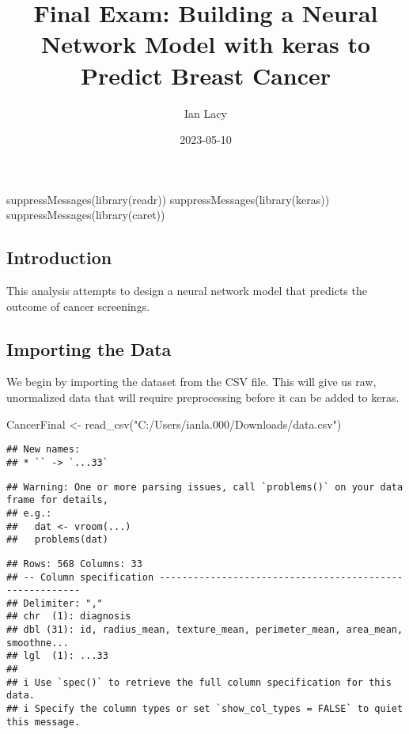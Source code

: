 \documentclass[
]{article}
\title{Final Exam: Building a Neural Network Model with keras to Predict
Breast Cancer}
\author{Ian Lacy}
\date{2023-05-10}
\newenvironment{Shaded}{\begin{snugshade}}{\end{snugshade}}
\newcommand{\FunctionTok}[1]{\textcolor[rgb]{0.00,0.00,0.00}{#1}}
\newcommand{\NormalTok}[1]{#1}
\newcommand{\OtherTok}[1]{\textcolor[rgb]{0.56,0.35,0.01}{#1}}
\newcommand{\StringTok}[1]{\textcolor[rgb]{0.31,0.60,0.02}{#1}}
\begin{document}
\maketitle

\begin{Shaded}
\begin{Highlighting}[]
\FunctionTok{suppressMessages}\NormalTok{(}\FunctionTok{library}\NormalTok{(readr))}
\FunctionTok{suppressMessages}\NormalTok{(}\FunctionTok{library}\NormalTok{(keras))}
\FunctionTok{suppressMessages}\NormalTok{(}\FunctionTok{library}\NormalTok{(caret))}
\end{Highlighting}
\end{Shaded}

\hypertarget{introduction}{%
\subsection{Introduction}\label{introduction}}

This analysis attempts to design a neural network model that predicts
the outcome of cancer screenings.

\hypertarget{importing-the-data}{%
\subsection{Importing the Data}\label{importing-the-data}}

We begin by importing the dataset from the CSV file. This will give us
raw, unormalized data that will require preprocessing before it can be
added to keras.

\begin{Shaded}
\begin{Highlighting}[]
\NormalTok{CancerFinal }\OtherTok{\textless{}{-}} \FunctionTok{read\_csv}\NormalTok{(}\StringTok{"C:/Users/ianla.000/Downloads/data.csv"}\NormalTok{)}
\end{Highlighting}
\end{Shaded}

\begin{verbatim}
## New names:
## * `` -> `...33`
\end{verbatim}

\begin{verbatim}
## Warning: One or more parsing issues, call `problems()` on your data frame for details,
## e.g.:
##   dat <- vroom(...)
##   problems(dat)
\end{verbatim}

\begin{verbatim}
## Rows: 568 Columns: 33
## -- Column specification --------------------------------------------------------
## Delimiter: ","
## chr  (1): diagnosis
## dbl (31): id, radius_mean, texture_mean, perimeter_mean, area_mean, smoothne...
## lgl  (1): ...33
## 
## i Use `spec()` to retrieve the full column specification for this data.
## i Specify the column types or set `show_col_types = FALSE` to quiet this message.
\end{verbatim}
\end{document}
